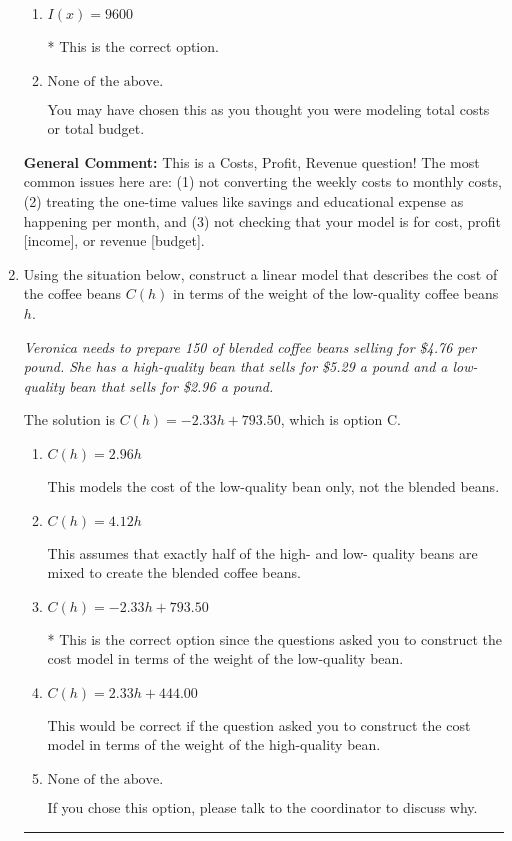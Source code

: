 \documentclass{extbook}[14pt]
\newcommand{\litem}[1]{\item #1

\rule{\textwidth}{0.4pt}}
\begin{document}
\begin{enumerate}
{\begin{enumerate}[label=\Alph*.]
This treats the educational expense as something you get every month rather than a 1-time payment.
\item \( I(x) = 9600 \)

* This is the correct option.
\item \( \text{None of the above.} \)

You may have chosen this as you thought you were modeling total costs or total budget.
\end{enumerate}

\textbf{General Comment:} This is a Costs, Profit, Revenue question! The most common issues here are: (1) not converting the weekly costs to monthly costs, (2) treating the one-time values like savings and educational expense as happening per month, and (3) not checking that your model is for cost, profit [income], or revenue [budget].
}
\litem{
Using the situation below, construct a linear model that describes the cost of the coffee beans $C(h)$ in terms of the weight of the low-quality coffee beans $h$.

\begin{center}
    \textit{ Veronica needs to prepare 150 of blended coffee beans selling for \$4.76 per pound. She has a high-quality bean that sells for \$5.29 a pound and a low-quality bean that sells for \$2.96 a pound. }
\end{center}
The solution is \( C(h) = -2.33 h + 793.50 \), which is option C.\begin{enumerate}[label=\Alph*.]
\item \( C(h) = 2.96 h \)

This models the cost of the low-quality bean only, not the blended beans.
\item \( C(h) = 4.12 h \)

This assumes that exactly half of the high- and low- quality beans are mixed to create the blended coffee beans.
\item \( C(h) = -2.33 h + 793.50 \)

* This is the correct option since the questions asked you to construct the cost model in terms of the weight of the low-quality bean.
\item \( C(h) = 2.33 h + 444.00 \)

This would be correct if the question asked you to construct the cost model in terms of the weight of the high-quality bean.
\item \( \text{None of the above.} \)

If you chose this option, please talk to the coordinator to discuss why.
\end{enumerate}

}
\end{enumerate}
\end{document}
